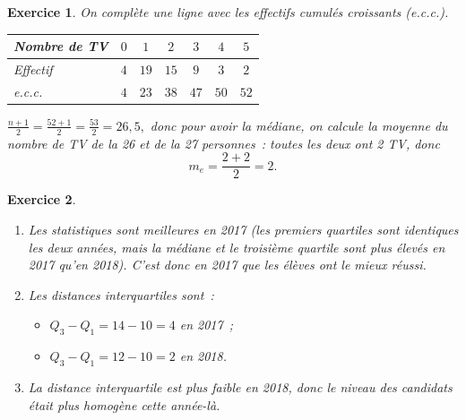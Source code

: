 \documentclass[10pt]{article}
\newtheorem{exo}{Exercice}
\begin{document}
\begin{exo}

On complète une ligne avec les effectifs cumulés croissants (e.c.c.).

\begin{center}
\begin{tabular}{|l|c|c|c|c|c|c|}
\hline

   Nombre de TV &$0$ &$1$ &$2$ &$3$&$4$&$5$\\
	\hline
   Effectif &$4$&$19$&$15$&$9$&$3$&$2$ \\
	\hline
	e.c.c. &$4$&$23$&$38$&$47$&$50$&$52$ \\
	\hline

\end{tabular}
\end{center}

$\frac{n+1}{2}=\frac{52+1}{2}=\frac{53}{2}=26,5,$ donc pour avoir la médiane, on calcule la moyenne du nombre de TV de la 26 et de la 27 personnes~: toutes les deux ont 2 TV, donc 
\[m_e=\frac{2+2}{2}=2.\]

\end{exo}

\begin{exo}



\begin{enumerate}
\item Les statistiques sont meilleures en 2017 (les premiers quartiles sont identiques les deux années, mais la médiane et le troisième quartile sont plus élevés en 2017 qu'en 2018). C'est donc en 2017 que les élèves ont le mieux réussi.
\item Les distances interquartiles sont~:

\begin{itemize}
\item[\textbullet] $Q_3-Q_1=14-10=4$ en 2017~;
\item[\textbullet] $Q_3-Q_1=12-10=2$ en 2018.
\end{itemize}

\item La distance interquartile est plus faible en 2018, donc le niveau des candidats était plus homogène cette année-là.
\end{enumerate}


\end{exo}
\end{document}
